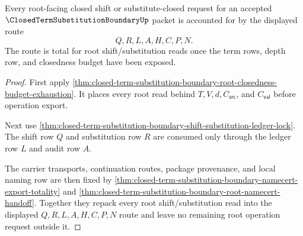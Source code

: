 \begin{theorem}
\label{thm:closed-term-substitution-boundary-root-shift-substitution-totality}
Every root-facing closed shift or substitute-closed request for an accepted $\ClosedTermSubstitutionBoundaryUp$ packet is accounted for by the displayed route
$$
Q,R,L,A,H,C,P,N.
$$
The route is total for root shift/substitution reads once the term rows, depth row, and closedness budget have been exposed.
\end{theorem}
\begin{proof}
First apply \autoref{thm:closed-term-substitution-boundary-root-closedness-budget-exhaustion}. It places every root read behind $T,V,d,C_{\mathsf{src}}$, and $C_{\mathsf{val}}$ before operation export.

Next use \autoref{thm:closed-term-substitution-boundary-shift-substitution-ledger-lock}. The shift row $Q$ and substitution row $R$ are consumed only through the ledger row $L$ and audit row $A$.

The carrier transports, continuation routes, package provenance, and local naming row are then fixed by \autoref{thm:closed-term-substitution-boundary-namecert-export-totality} and \autoref{thm:closed-term-substitution-boundary-root-namecert-handoff}. Together they repack every root shift/substitution read into the displayed $Q,R,L,A,H,C,P,N$ route and leave no remaining root operation request outside it.
\end{proof}

